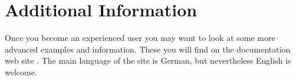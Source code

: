 \section{Additional Information}
\label{sec:introduction.moreinfos}

Once you become an experienced {\KOMAScript} user you may want to look at some
more advanced examples and information. These you will find on the
{\KOMAScript} documentation web site \cite{homepage}. The main language of the
site is German, but nevertheless English is welcome.

\endinput
